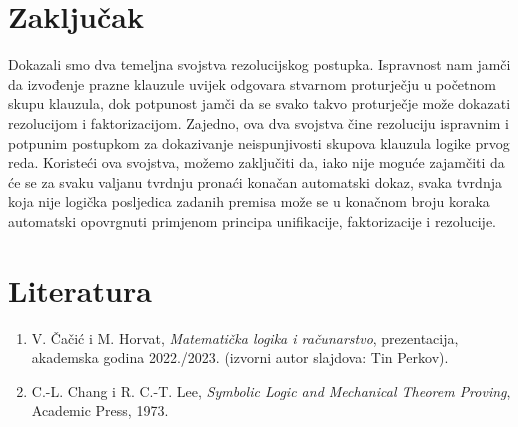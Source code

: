 \documentclass{article}
\theoremstyle{definition}
\theoremstyle{plain}
\begin{document}
\section{Zaključak}
Dokazali smo dva temeljna svojstva rezolucijskog postupka. Ispravnost nam jamči da izvođenje prazne klauzule uvijek odgovara stvarnom proturječju u početnom skupu klauzula, dok potpunost jamči da se svako takvo proturječje može dokazati rezolucijom i faktorizacijom. Zajedno, ova dva svojstva čine rezoluciju ispravnim i potpunim postupkom za dokazivanje neispunjivosti skupova klauzula logike prvog reda. Koristeći ova svojstva, možemo zaključiti da, iako nije moguće zajamčiti da će se za svaku valjanu tvrdnju pronaći konačan automatski dokaz, svaka tvrdnja koja nije logička posljedica zadanih premisa može se u konačnom broju koraka automatski opovrgnuti primjenom principa unifikacije, faktorizacije i rezolucije.

\section*{Literatura}

\begin{enumerate}
\item V. Čačić i M. Horvat, \textit{Matematička logika i računarstvo}, prezentacija, akademska godina 2022./2023. (izvorni autor slajdova: Tin Perkov).

\item C.-L. Chang i R. C.-T. Lee, \textit{Symbolic Logic and Mechanical Theorem Proving}, Academic Press, 1973.
\end{enumerate}
\end{document}
